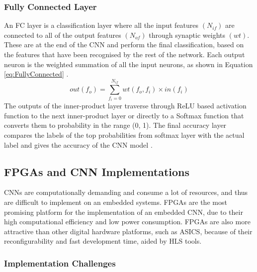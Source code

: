 \documentclass[12pt]{article}
\begin{document}
\subsubsection{Fully Connected Layer}
\label{sec:Background-CNN-FC}


An FC layer is a classification layer where all the input features $(N_{if})$ are connected to all of the output features $(N_{of})$ through synaptic weights $(wt)$. These are at the end of the CNN and perform the final classification, based on the features that have been recognised by the rest of the network. Each output neuron is the weighted summation of all the input neurons, as shown in Equation \ref{eq:FullyConnected} \cite{SudaFpgaAccelerator}.
\begin{equation}
out(f_o)=\sum^{N_{if}}_{f_i=0}wt(f_o,f_i)\times in(f_i)
\label{eq:FullyConnected}
\end{equation}
The outputs of the inner-product layer traverse through ReLU based activation function to the next inner-product layer or directly to a Softmax function that converts them to probability in the range (0, 1). The final accuracy layer compares the labels of the top probabilities from softmax layer with the actual label and gives the accuracy of the CNN model \cite{SudaFpgaAccelerator}.

\subsection{FPGAs and CNN Implementations}
\label{sec:Background-FpgaCnnImpl}


CNNs are computationally demanding and consume a lot of resources, and thus are difficult to implement on an embedded systems. FPGAs are the most promising platform for the implementation of an embedded CNN, due to their high computational efficiency and low power consumption. FPGAs are also more attractive than other digital hardware platforms, such as ASICS, because of their reconfigurability and fast development time, aided by HLS tools.

\subsubsection{Implementation Challenges}
\label{sec:Background-FpgaCnnImpl-Challenges}
\end{document}

